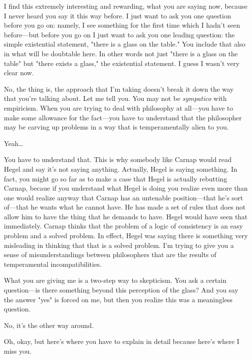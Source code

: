  I find this extremely interesting and rewarding, what you are 
saying now, because I never heard you say it this way before. I just want 
to ask you one question before you go on: namely, I see something for 
the first time which I hadn't seen before---but before you go on I just 
want to ask you one leading question: the simple existential statement, 
"there is a glass on the table." You include that also in what will be 
doubtable here. In other words not just "there is a glass on the table" 
but "there exists a glass," the existential statement. I guess I wasn't very 
clear now. 

 No, the thing is, the approach that I'm taking doesn't break it 
down the way that you're talking about. Let me tell you. You may not 
be \emph{sympatico} with empiricism. When you are trying to deal with 
philosophy at all---you have to make some allowance for the 
fact---you have to understand that the philosopher may be carving up 
problems in a way that is temperamentally alien to you. 

 Yeah\ldots

 You have to understand that. This is why somebody like 
Carnap would read Hegel and say it's not saying anything. Actually, 
Hegel is saying something. In fact, you might go so far as to make a case 
that Hegel is actually rebutting Carnap, becaue if you understand what 
Hegel is doing you realize even more than one would realize anyway 
that Carnap has an untenable position---that he's sort of---that he 
wants what he cannot have. He has made a set of rules that does not 
allow him to have the thing that he demands to have. Hegel would have 
seen that immediately. Carnap thinks that the problem of a logic of 
consistency is an easy problem and a solved problem. In effect, Hegel 
was saying there is something very misleading in thinking that that is a 
solved problem. I'm trying to give you a sense of misunderstandings 
between philosophers that are the results of temperamental incompatibilities. 


 What you are giving me is a two-step way to skepticism. You 
ask a certain question---is there something beyond this perception of 
the glass? And you say the answer "yes" is forced on me, but then you 
realize this was a meaningless question. 

 No, it's the other way around. 

 Oh, okay, but here's where you have to explain in detail 
because here's where I miss you. 

